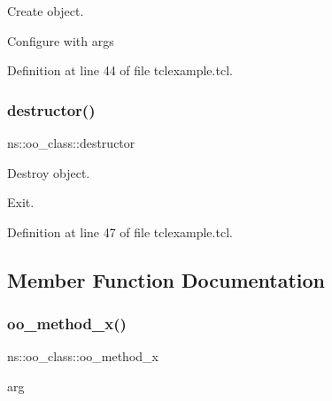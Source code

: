 Create object. 

Configure with args 

Definition at line 44 of file tclexample.\+tcl.


\begin{DoxyCode}{0}

\end{DoxyCode}
\mbox{\label{classns_1_1oo__class_af148cfc1c090a05986c68ac9452a510a}} 
\subsubsection{\texorpdfstring{destructor()}{destructor()}}
{\footnotesize\ttfamily ns\+::oo\+\_\+class\+::destructor}



Destroy object. 

Exit. 

Definition at line 47 of file tclexample.\+tcl.


\begin{DoxyCode}{0}

\end{DoxyCode}


\subsection{Member Function Documentation}
\mbox{\label{classns_1_1oo__class_a96fc5f92e0f8cb7a06d468a650141d59}} 
\subsubsection{\texorpdfstring{oo\_method\_x()}{oo\_method\_x()}}
{\footnotesize\ttfamily ns\+::oo\+\_\+class\+::oo\+\_\+method\+\_\+x\begin{DoxyParamCaption}\item[{}]{arg  }\end{DoxyParamCaption}\hspace{0.3cm}{\ttfamily [private]}}



